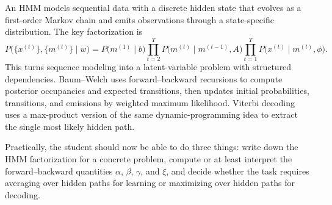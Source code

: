 An HMM models sequential data with a discrete hidden state that evolves as a first-order Markov chain and emits observations through a state-specific distribution. The key factorization is
\[
  P\bigl(\{x^{(t)}\},\{m^{(t)}\}\mid w\bigr)
  =
  P\bigl(m^{(1)}\mid b\bigr)
  \prod_{t=2}^{T}P\bigl(m^{(t)}\mid m^{(t-1)},A\bigr)
  \prod_{t=1}^{T}P\bigl(x^{(t)}\mid m^{(t)},\phi\bigr).
\]
This turns sequence modeling into a latent-variable problem with structured dependencies. Baum--Welch uses forward--backward recursions to compute posterior occupancies and expected transitions, then updates initial probabilities, transitions, and emissions by weighted maximum likelihood. Viterbi decoding uses a max-product version of the same dynamic-programming idea to extract the single most likely hidden path.

Practically, the student should now be able to do three things: write down the HMM factorization for a concrete problem, compute or at least interpret the forward--backward quantities $\alpha$, $\beta$, $\gamma$, and $\xi$, and decide whether the task requires averaging over hidden paths for learning or maximizing over hidden paths for decoding.
